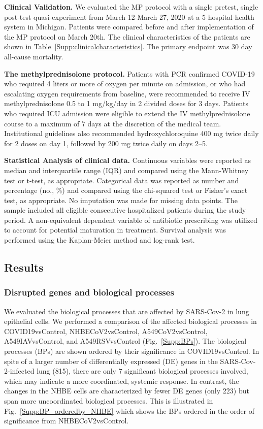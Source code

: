 \documentclass[Minh_PhD_thesis.tex]{subfiles}
\begin{document}
\textbf{Clinical Validation.} 
We evaluated the MP protocol with a single pretest, single post-test quasi-experiment from March 12-March 27, 2020 at a 5 hospital health system in Michigan. Patients were compared before and after implementation of the MP protocol on March 20th. The clinical characteristics of the patients are shown in Table~\ref{Supp:clinicalcharacteristics}. 
The primary endpoint was 30 day all-cause mortality.  

\textbf{The methylprednisolone protocol.}  
Patients with PCR confirmed COVID-19 who required 4 liters or more of oxygen per minute on admission, or who had escalating oxygen requirements from baseline, were recommended to receive IV methylprednisolone 0.5 to 1 mg/kg/day in 2 divided doses for 3 days. Patients who required ICU admission were eligible to extend the IV methylprednisolone course to a maximum of 7 days at the discretion of the medical team. Institutional guidelines also recommended hydroxychloroquine 400 mg twice daily for 2 doses on day 1, followed by 200 mg twice daily on days 2--5.

\textbf{Statistical Analysis of clinical data.} Continuous variables were reported as median and interquartile range (IQR) and compared using the Mann-Whitney test or t-test, as appropriate. Categorical data was reported as number and percentage (no., \%) and compared using the chi-squared test or Fisher's exact test, as appropriate. No imputation was made for missing data points. The sample included all eligible consecutive hospitalized patients during the study period. A non-equivalent dependent variable of antibiotic prescribing was utilized to account for potential maturation in treatment. Survival analysis was performed using the Kaplan-Meier method and log-rank test. 






\subsection{Results}
\subsubsection{Disrupted genes and biological processes} 

We evaluated the biological processes that are affected by SARS-Cov-2 in lung epithelial cells.  We performed a  comparison of the affected biological processes in COVID19vsControl, NHBECoV2vsControl, A549CoV2vsControl, A549IAVvsControl, and A549RSVvsControl (Fig.~\ref{Supp:BPs}). 
The biological processes (BPs) are shown ordered by their significance  in  COVID19vsControl.  
In spite of a larger number of differentially expressed (DE) genes in the SARS-Cov-2-infected lung (815), there are only 7 significant biological processes involved, which may indicate a more coordinated, systemic response. In contrast, the changes in the NHBE cells are characterized by fewer DE genes (only 223) but span more uncoordinated biological processes. 
This is illustrated in Fig.~\ref{Supp:BP_orderedby_NHBE} which shows the BPs ordered in the order of significance from NHBECoV2vsControl.
\end{document}
